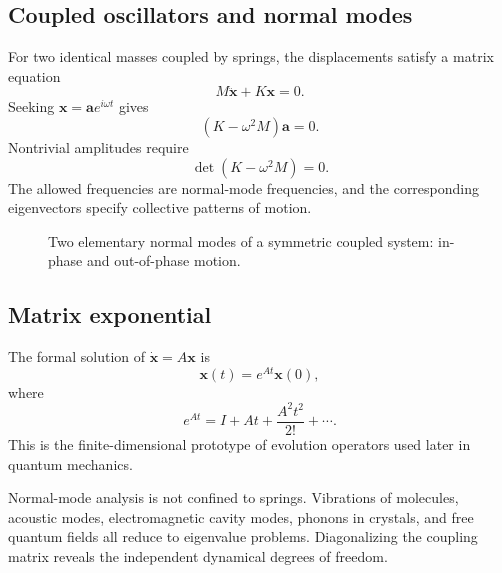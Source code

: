 \subsection{Coupled oscillators and normal modes}
For two identical masses coupled by springs, the displacements satisfy a matrix equation
\[
M\ddot{\mathbf{x}}+K\mathbf{x}=0.
\]
Seeking $\mathbf{x}=\mathbf{a}e^{i\omega t}$ gives
\[
(K-\omega^2M)\mathbf{a}=0.
\]
Nontrivial amplitudes require
\[
\det(K-\omega^2M)=0.
\]
The allowed frequencies are normal-mode frequencies, and the corresponding eigenvectors specify collective patterns of motion.

\begin{figure}[htbp]
\centering

\caption{Two elementary normal modes of a symmetric coupled system: in-phase and out-of-phase motion.}
\label{fig:ch4-coupled-modes}
\end{figure}

\subsection{Matrix exponential}
The formal solution of $\dot{\mathbf{x}}=A\mathbf{x}$ is
\[
\boxed{\mathbf{x}(t)=e^{At}\mathbf{x}(0)},
\]
where
\[
e^{At}=I+At+\frac{A^2t^2}{2!}+\cdots.
\]
This is the finite-dimensional prototype of evolution operators used later in quantum mechanics.

\begin{physicalbox}
Normal-mode analysis is not confined to springs. Vibrations of molecules, acoustic modes, electromagnetic cavity modes, phonons in crystals, and free quantum fields all reduce to eigenvalue problems. Diagonalizing the coupling matrix reveals the independent dynamical degrees of freedom.
\end{physicalbox}
